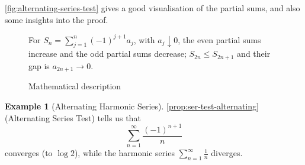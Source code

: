 \documentclass[11pt]{article}
\numberwithin{equation}{section}
\theoremstyle{definition}
\newtheorem{example}[theorem]{Example}
\theoremstyle{remark}
\newcommand{\pqty}[1]{\left(#1\right)}
\begin{document}
\autoref{fig:alternating-series-test} gives a good visualisation of the partial sums, and also some insights into the proof.

\begin{figure}[ht!]\centering\begin{minipage}{.94\linewidth}For \(S_n=\sum_{j=1}^n(-1)^{j+1}a_j\), with \(a_j\downarrow0\), the even partial sums increase and the odd partial sums decrease; \(S_{2n}\le S_{2n+1}\) and their gap is \(a_{2n+1}\to0\).\end{minipage}\caption{Mathematical description}\label{fig:alternating-series-test}\end{figure}

\begin{example}[Alternating Harmonic Series]\label{analysis-unit-0053}
    \label{ex:alternating-harmonic}%
    \autoref{prop:ser-test-alternating} (Alternating Series Test) tells us that
    \[
        \sum_{n = 1}^{\infty} \frac{\pqty{-1}^{n + 1}}{n}
    \]
    converges (to \(\log 2\)), while the harmonic series \(\sum_{n = 1}^{\infty} \frac{1}{n}\) diverges.
\end{example}
\end{document}
